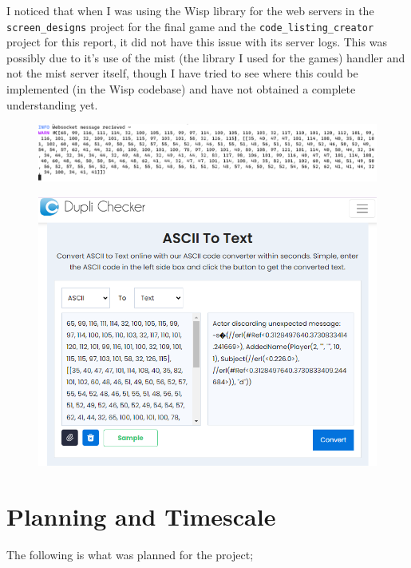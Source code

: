 \documentclass[]{final}
\begin{document}
I noticed that when I was using the Wisp library for the web servers in the
\lstinline|screen_designs| project for the final game and the
\lstinline|code_listing_creator| project for this report, it did not have
this issue with its server logs. This was possibly due
to it's use of the mist (the library I used for the games) handler and not the
mist server itself, though I have tried to see where this could be
implemented (in the Wisp codebase) and have not obtained a complete
understanding yet.

\begin{figure}[H]
  \includegraphics[width=\linewidth]{ascii_err.png}
\end{figure}

\begin{figure}[H]
  \centering
  \includegraphics[width=.8\linewidth]{ascii_err_converted.png}
\end{figure}

\chapter{Planning and Timescale}

The following is what was planned for the project;
\end{document}

